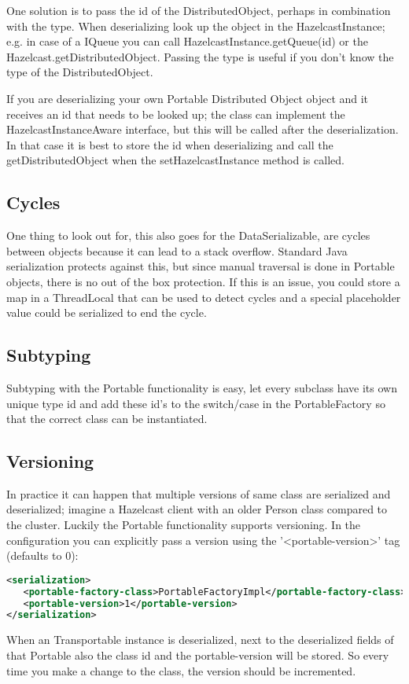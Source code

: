 One solution is to pass the id of the DistributedObject, perhaps in combination with the type. When deserializing look up the object in the HazelcastInstance; e.g. in case of a IQueue you can call HazelcastInstance.getQueue(id) or the Hazelcast.getDistributedObject. Passing the type is useful if you don't know the type of the DistributedObject.

If you are deserializing your own Portable Distributed Object object and it receives an id that needs to be looked up; the class can implement the HazelcastInstanceAware interface, but this will be called after the deserialization. In that case it is best to store the id when deserializing and call the getDistributedObject when the setHazelcastInstance method is called.

\subsection*{Cycles}
One thing to look out for, this also goes for the DataSerializable, are cycles between objects because it can lead to a stack overflow. Standard Java serialization protects against this, but since manual traversal is done in Portable objects, there is no out of the box protection. If this is an issue, you could store a map in a ThreadLocal that can be used to detect cycles and a special placeholder value could be serialized to end the cycle.

\subsection*{Subtyping}
Subtyping with the Portable functionality is easy, let every subclass have its own unique type id and add these id's to the switch/case in the PortableFactory so that the correct class can be instantiated. 

\subsection*{Versioning}
In practice it can happen that multiple versions of same class are serialized and deserialized; imagine a Hazelcast client with an older Person class compared to the cluster. Luckily the Portable functionality supports versioning. In the configuration you can explicitly pass a version using the '<portable-version>' tag (defaults to 0):
\begin{lstlisting}[language=xml]
<serialization>
   <portable-factory-class>PortableFactoryImpl</portable-factory-class>
   <portable-version>1</portable-version>
</serialization>
\end{lstlisting}
When an Transportable instance is deserialized, next to the deserialized fields of that Portable also the class id and the portable-version will be stored. So every time you make a change to the class, the version should be incremented. 

